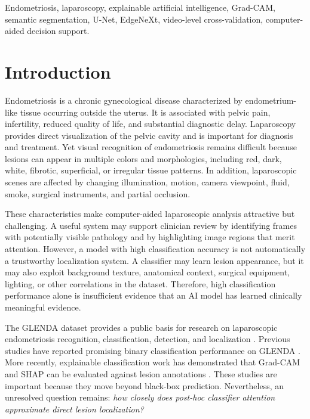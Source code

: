 \begin{IEEEkeywords}
Endometriosis, laparoscopy, explainable artificial intelligence, Grad-CAM, semantic segmentation, U-Net, EdgeNeXt, video-level cross-validation, computer-aided decision support.
\end{IEEEkeywords}

\section{Introduction}

Endometriosis is a chronic gynecological disease characterized by endometrium-like tissue occurring outside the uterus. It is associated with pelvic pain, infertility, reduced quality of life, and substantial diagnostic delay. Laparoscopy provides direct visualization of the pelvic cavity and is important for diagnosis and treatment. Yet visual recognition of endometriosis remains difficult because lesions can appear in multiple colors and morphologies, including red, dark, white, fibrotic, superficial, or irregular tissue patterns. In addition, laparoscopic scenes are affected by changing illumination, motion, camera viewpoint, fluid, smoke, surgical instruments, and partial occlusion.

These characteristics make computer-aided laparoscopic analysis attractive but challenging. A useful system may support clinician review by identifying frames with potentially visible pathology and by highlighting image regions that merit attention. However, a model with high classification accuracy is not automatically a trustworthy localization system. A classifier may learn lesion appearance, but it may also exploit background texture, anatomical context, surgical equipment, lighting, or other correlations in the dataset. Therefore, high classification performance alone is insufficient evidence that an AI model has learned clinically meaningful evidence.

The GLENDA dataset provides a public basis for research on laparoscopic endometriosis recognition, classification, detection, and localization \cite{leibetseder2020glenda}. Previous studies have reported promising binary classification performance on GLENDA \cite{zaidi2025deep,zhu2025xai}. More recently, explainable classification work has demonstrated that Grad-CAM and SHAP can be evaluated against lesion annotations \cite{zhu2025xai}. These studies are important because they move beyond black-box prediction. Nevertheless, an unresolved question remains: \emph{how closely does post-hoc classifier attention approximate direct lesion localization?}


